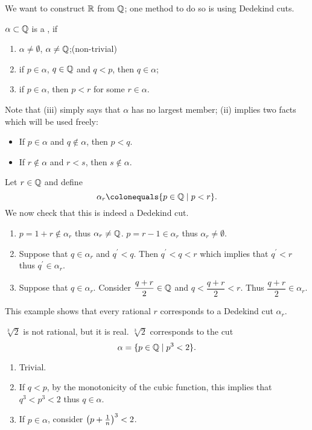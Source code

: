 We want to construct $\mathbb R$ from $\mathbb Q$; one method to do so is using Dedekind cuts.

\begin{definition}
$\alpha\subset\mathbb Q$ is a , if
\begin{enumerate}[label=(\roman*)]
\item $\alpha\neq\emptyset$, $\alpha\neq\mathbb Q$;\hfill(non-trivial)
\item if $p\in\alpha$, $q\in\mathbb Q$ and $q<p$, then $q\in\alpha$;
\item if $p\in\alpha$, then $p<r$ for some $r\in\alpha$.
\end{enumerate}
\end{definition}

\begin{remark}
Note that (iii) simply says that $\alpha$ has no largest member; (ii) implies two facts which will be used freely:
\begin{itemize}
\item If $p\in\alpha$ and $q\notin\alpha$, then $p<q$.
\item If $r\notin\alpha$ and $r<s$, then $s\notin\alpha$.
\end{itemize}
\end{remark}

\begin{example}
Let $r\in\mathbb Q$ and define
\[ \alpha_r\colonequals\{p\in\QQ\mid p<r\}. \]
We now check that this is indeed a Dedekind cut.
\begin{enumerate}[label=(\roman*)]
\item $p=1+r\notin\alpha_r$ thus $\alpha_r\neq\mathbb Q$. $p=r-1\in\alpha_r$ thus $\alpha_r\neq\emptyset$.

\item Suppose that $q\in\alpha_r$ and $q^\prime<q$. Then $q^\prime<q<r$ which implies that $q^\prime<r$ thus $q^\prime\in\alpha_r$.

\item Suppose that $q\in\alpha_r$. Consider $\dfrac{q+r}{2}\in\mathbb Q$ and $q<\dfrac{q+r}{2}<r$. Thus $\dfrac{q+r}{2}\in\alpha_r$.
\end{enumerate}
\end{example}

This example shows that every rational $r$ corresponds to a Dedekind cut $\alpha_r$.

\begin{example}
$\sqrt[3]{2}$ is not rational, but it is real. $\sqrt[3]{2}$ corresponds to the cut
\[ \alpha=\{p\in\mathbb Q\mid p^3<2\}. \]
\begin{enumerate}[label=(\roman*)]
\item Trivial.
\item If $q<p$, by the monotonicity of the cubic function, this implies that $q^3<p^3<2$ thus $q\in\alpha$.
\item If $p\in\alpha$, consider $\left(p+\frac{1}{n}\right)^3<2$.
\end{enumerate}
\end{example}

